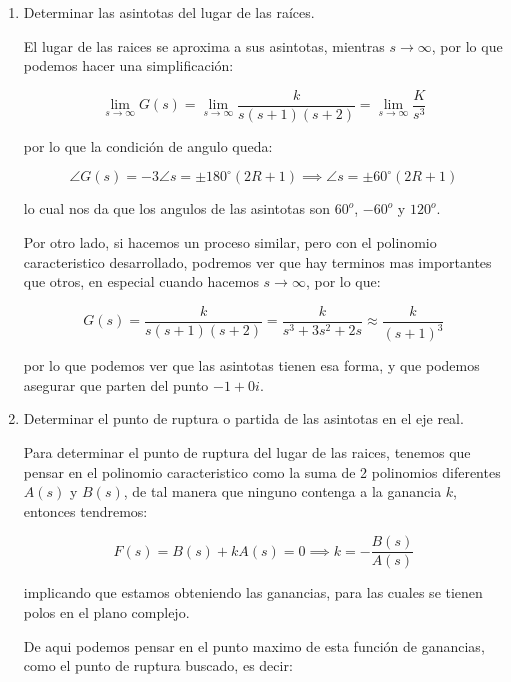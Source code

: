 \begin{enumerate}
		\item Determinar las asintotas del lugar de las raíces.

		El lugar de las raices se aproxima a sus asintotas, mientras $s \to \infty$, por lo que podemos hacer una simplificación:

		\begin{equation*}
			\lim_{s \to \infty} G(s) = \lim_{s \to \infty} \frac{k}{s(s+1)(s+2)} = \lim_{s \to \infty} \frac{K}{s^3}
		\end{equation*}

		por lo que la condición de angulo queda:

		\begin{equation*}
			\angle G(s) = -3 \angle s = \pm 180^{\circ} (2R + 1) \implies \angle s = \pm 60^{\circ} (2R + 1)
		\end{equation*}

		lo cual nos da que los angulos de las asintotas son $60^o$, $-60^o$ y $120^o$.

		Por otro lado, si hacemos un proceso similar, pero con el polinomio caracteristico desarrollado, podremos ver que hay terminos mas importantes que otros, en especial cuando hacemos $s \to \infty$, por lo que:

		\begin{equation*}
			G(s) = \frac{k}{s(s+1)(s+2)} = \frac{k}{s^3 + 3 s^2 + 2 s} \approx \frac{k}{(s+1)^3}
		\end{equation*}

		por lo que podemos ver que las asintotas tienen esa forma, y que podemos asegurar que parten del punto $-1 + 0 i$.

		\item Determinar el punto de ruptura o partida de las asintotas en el eje real.

		Para determinar el punto de ruptura del lugar de las raices, tenemos que pensar en el polinomio caracteristico como la suma de 2 polinomios diferentes $A(s)$ y $B(s)$, de tal manera que ninguno contenga a la ganancia $k$, entonces tendremos:

		\begin{equation*}
			F(s) = B(s) + k A(s) = 0 \implies k = - \frac{B(s)}{A(s)}
		\end{equation*}

		implicando que estamos obteniendo las ganancias, para las cuales se tienen polos en el plano complejo.

		De aqui podemos pensar en el punto maximo de esta función de ganancias, como el punto de ruptura buscado, es decir:


\end{enumerate}
